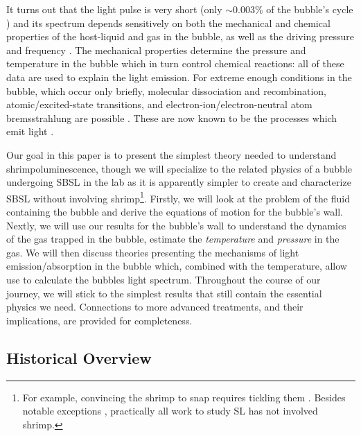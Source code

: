 \documentclass[prb,aps,nofootinbib,superscriptaddress,floatfix]{revtex4-2}
\begin{document}
It turns out that the light pulse is very short (only $\sim0.003\%$ of the bubble's cycle \cite{suslick2008inside}) and its spectrum depends sensitively on both the mechanical and chemical properties of the host-liquid and gas in the bubble, as well as the driving pressure and frequency \cite{brenner2002single,suslick2008inside}. The mechanical properties determine the pressure and temperature in the bubble which in turn control chemical reactions: all of these data are used to explain the light emission. For extreme enough conditions in the bubble, which occur only briefly, molecular dissociation and recombination, atomic/excited-state transitions, and electron-ion/electron-neutral atom bremsstrahlung are possible \cite{an2009diagnosing,an2008spectral,an2006mechanism,flannigan2005plasma,suslick2008inside,flannigan2006measurement}. These are now known to be the processes which emit light \cite{lohse2018bubble,yasui2018acoustic}.

Our goal in this paper is to present the simplest theory needed to understand shrimpoluminescence, though we will specialize to the related physics of a bubble undergoing SBSL in the lab as it is apparently simpler to create and characterize SBSL without involving shrimp\footnote{For example, convincing the shrimp to snap requires tickling them \cite{lohse2001snapping,versluis2000snapping,lohse2018bubble}. Besides notable exceptions \cite{tang2019bioinspired}, practically all work to study SL has not involved shrimp.}. Firstly, we will look at the problem of the fluid containing the bubble and derive the equations of motion for the bubble's wall. Nextly, we will use our results for the bubble's wall to understand the dynamics of the gas trapped in the bubble, estimate the \emph{temperature} and \emph{pressure} in the gas. We will then discuss theories presenting the mechanisms of light emission/absorption in the bubble which, combined with the temperature, allow use to calculate the bubbles light spectrum. Throughout the course of our journey, we will stick to the simplest results that still contain the essential physics we need. Connections to more advanced treatments, and their implications, are provided for completeness.

\subsection{Historical Overview}
\end{document}
